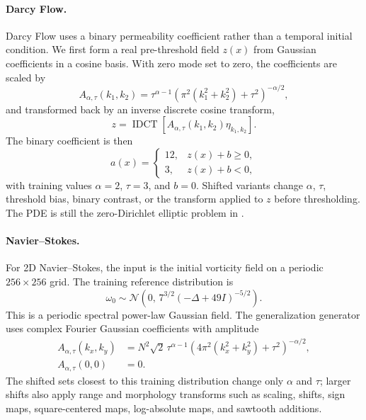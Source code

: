 \paragraph{Darcy Flow.}
Darcy Flow uses a binary permeability coefficient rather than a temporal
initial condition. We first form a real pre-threshold field $z(x)$ from
Gaussian coefficients in a cosine basis. With zero mode set to zero, the
coefficients are scaled by
\begin{equation}
  A_{\alpha,\tau}(k_1,k_2)
  =
  \tau^{\alpha-1}
  \left(
    \pi^2(k_1^2+k_2^2)+\tau^2
  \right)^{-\alpha/2},
\end{equation}
and transformed back by an inverse discrete cosine transform,
\begin{equation}
  z
  =
  \operatorname{IDCT}
  \left[
    A_{\alpha,\tau}(k_1,k_2)\eta_{k_1,k_2}
  \right].
\end{equation}
The binary coefficient is then
\begin{equation}
  a(x)=
  \begin{cases}
    12, & z(x)+b\ge 0,\\
    3, & z(x)+b<0,
  \end{cases}
\end{equation}
with training values $\alpha=2$, $\tau=3$, and $b=0$. Shifted variants change
$\alpha$, $\tau$, threshold bias, binary contrast, or the transform applied to
$z$ before thresholding. The PDE is still the zero-Dirichlet elliptic problem in
.

\paragraph{Navier--Stokes.}
For 2D Navier--Stokes, the input is the initial vorticity field on
a periodic $256\times256$ grid. The training reference distribution is
\begin{equation}
  \omega_0
  \sim
  \mathcal N
  \left(
    0,\,
    7^{3/2}(-\Delta+49I)^{-5/2}
  \right).
\end{equation}
This is a periodic spectral power-law Gaussian field. The generalization generator uses
complex Fourier Gaussian coefficients with amplitude
\begin{align}
  A_{\alpha,\tau}(k_x,k_y)
  &=
  N^2\sqrt{2}\,
  \tau^{\alpha-1}
  \left(
    4\pi^2(k_x^2+k_y^2)+\tau^2
  \right)^{-\alpha/2},
  \nonumber\\
  A_{\alpha,\tau}(0,0)
  &=0 .
\end{align}
The shifted sets closest to this training distribution change only $\alpha$ and
$\tau$; larger shifts also apply range and morphology transforms such as scaling,
shifts, sign maps, square-centered maps, log-absolute maps, and sawtooth
additions.


